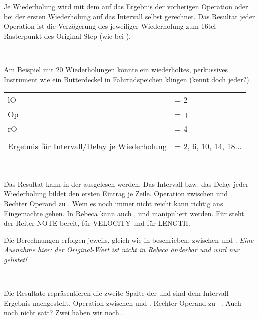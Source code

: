 \documentclass[10pt,final,a4paper]{report}
\begin{document}
Je Wiederholung wird  mit dem  auf das Ergebnis der vorherigen Operation oder bei der ersten Wiederholung auf das Intervall selbst gerechnet. Das Resultat jeder Operation ist die Verzögerung des  jeweiliger Wiederholung zum 16tel-Rasterpunkt des Original-Step (wie bei ).

~

Am Beispiel mit 20 Wiederholungen könnte ein wiederholtes, perkussives Instrument wie ein Butterdeckel in Fahrradspeichen klingen (kennt doch jeder?).

\begin{tabular}{ll}
lO &= 2\\
Op &= +\\
rO &= 4\\
\\
Ergebnis für Intervall/Delay je Wiederholung & = 2, 6, 10, 14, 18...
\end{tabular}

~

Das Resultat kann in der  ausgelesen werden. Das Intervall bzw. das Delay jeder Wiederholung bildet den ersten Eintrag je Zeile.  
%
%
%
Operation zwischen  und .
%
%
%
Rechter Operand zu .
%
%
%
Wem es noch immer nicht reicht kann richtig ans Eingemachte gehen. In Rebeca kann auch ,  und  manipuliert werden. Für  steht der Reiter NOTE bereit, für  VELOCITY und für  LENGTH.

Die Berechnungen erfolgen jeweils, gleich wie in  beschrieben, zwischen  und . \textit{Eine Ausnahme hier: der Original-Wert ist nicht in Rebeca änderbar und wird nur gelistet!}

~

Die Resultate repräsentieren die zweite Spalte der  und sind dem Intervall-Ergebnis nachgestellt.
%
%
%
Operation zwischen  und .
%
%
%
Rechter Operand zu ~.
%
%
%
Auch noch nicht satt? Zwei haben wir noch...
\end{document}
